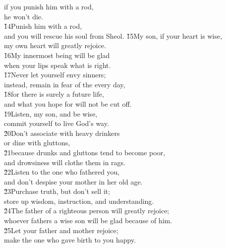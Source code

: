 \begin{poetry}
\poemll    if you punish him with a rod, \\
\poemlll       he won't die. \\
\poeml \v{14}Punish him with a rod, \\
\poemll    and you will rescue his soul from Sheol.
\poeml \v{15}My son, if your heart is wise, \\
\poemll    my own heart will greatly rejoice. \\
\poeml \v{16}My innermost being will be glad \\
\poemll    when your lips speak what is right. \\
\poeml \v{17}Never let yourself envy sinners; \\
\poemll    instead, remain in fear of the  every day, \\
\poeml \v{18}for there is surely a future life, \\
\poemll    and what you hope for will not be cut off. \\
\poeml \v{19}Listen, my son, and be wise, \\
\poemll    commit yourself to live God's way. \\
\poeml \v{20}Don't associate with heavy drinkers \\
\poemll    or dine with gluttons, \\
\poeml \v{21}because drunks and gluttons tend to become poor, \\
\poemll    and drowsiness will clothe them in rags. \\
\poeml \v{22}Listen to the one who fathered you, \\
\poemll    and don't despise your mother in her old age. \\
\poeml \v{23}Purchase truth, but don't sell it; \\
\poemll    store up wisdom, instruction, and understanding. \\
\poeml \v{24}The father of a righteous person will greatly rejoice; \\
\poemll    whoever fathers a wise son will be glad because of him. \\
\poeml \v{25}Let your father and mother rejoice; \\
\poemll    make the one who gave birth to you happy. \\

\end{poetry}
